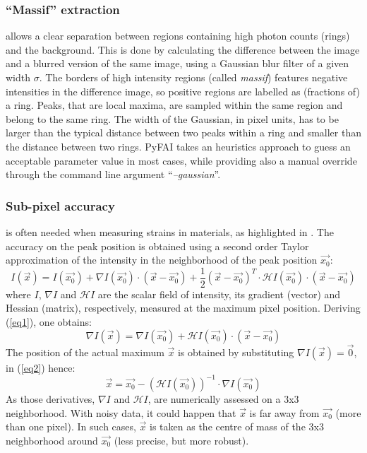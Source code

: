 \documentclass[preprint]{iucr}
\begin{document}
\subsubsection{``Massif'' extraction}
\label{massif}
allows a clear separation between regions containing high
photon counts (rings) and the background.
This is done by calculating the difference between the image and a blurred version
of the same image, using a Gaussian blur filter of a given width $\sigma$.
The borders of high intensity regions (called \textit{massif}) features
negative intensities in the difference image, so positive regions are labelled
as (fractions of) a ring.
Peaks, that are local maxima,
are sampled within the same region and belong to the same ring.
The width of the Gaussian, in pixel units, has to be larger than the typical
distance between two peaks within a ring and smaller than the distance between two
rings.
PyFAI takes an heuristics approach to guess an acceptable parameter value in
most cases, while providing also a manual override through the command line
argument ``\textit{--gaussian}''.

\subsubsection{Sub-pixel accuracy}
\label{subpixel}
is often needed when measuring strains in materials, as highlighted in
\cite{to5079}.
The accuracy on the peak position is obtained using a second order Taylor
approximation of the intensity in the neighborhood of the peak
position $\overrightarrow{x_0}$:
\begin{equation}
\label{eq1}
I(\overrightarrow{x}) = I(\overrightarrow{x_0}) + \nabla
I(\overrightarrow{x_0})\cdot (\overrightarrow{x}-\overrightarrow{x_0}) +
\frac{1}{2} (\overrightarrow{x}-\overrightarrow{x_0})^T\cdot\mathcal{H}
I(\overrightarrow{x_0})\cdot(\overrightarrow{x}-\overrightarrow{x_0})
\end{equation}
where $I$,
$\nabla I$ and $\mathcal{H} I$ are the scalar field of intensity, its gradient
(vector) and Hessian (matrix), respectively, measured at the maximum pixel position.
Deriving (\ref{eq1}), one obtains:
\begin{equation}
\label{eq2}
\nabla I(\overrightarrow{x}) =\nabla I(\overrightarrow{x_0}) +
\mathcal{H}I(\overrightarrow{x_0})\cdot(\overrightarrow{x}-\overrightarrow{x_0})
\end{equation}
The position of the actual maximum $\overrightarrow{x}$ is obtained by substituting
$\nabla I(\overrightarrow{x})=\overrightarrow{0}$, in (\ref{eq2}) hence:
\begin{equation}
\label{eq3}
\overrightarrow{x} = \overrightarrow{x_0} - (\mathcal{H}
I(\overrightarrow{x_0}))^{-1}\cdot\nabla I(\overrightarrow{x_0})
 \end{equation}
As those derivatives, $\nabla I$ and $\mathcal{H} I$, are numerically assessed
on a 3x3 neighborhood. With noisy data, it could happen that
$\overrightarrow{x}$ is far away from $\overrightarrow{x_0}$ (more than one
pixel).
In such cases, $\overrightarrow{x}$ is taken as the centre of mass of the 3x3
neighborhood around $\overrightarrow{x_0}$ (less precise, but more robust).
\end{document}

